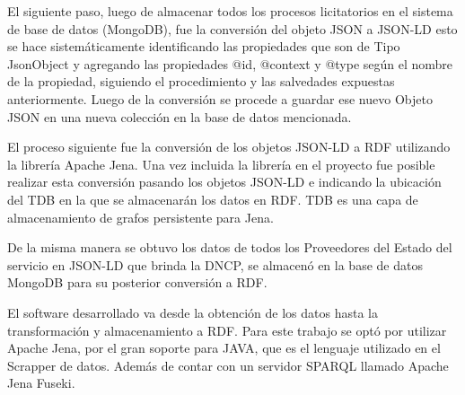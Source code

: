 El siguiente paso, luego de almacenar todos los procesos licitatorios en el sistema de base de datos  (MongoDB), fue la conversión del objeto JSON a JSON-LD esto se hace sistemáticamente identificando las propiedades que son de Tipo JsonObject y agregando las propiedades @id, @context y @type según el nombre de la propiedad, siguiendo el procedimiento y las salvedades expuestas anteriormente. Luego de la conversión se procede a guardar ese nuevo Objeto JSON en una nueva colección en la base de datos mencionada.

El proceso siguiente fue la conversión de los objetos JSON-LD a RDF utilizando la librería Apache Jena. Una vez incluida la librería en el proyecto fue posible realizar esta conversión pasando los objetos JSON-LD e indicando la ubicación del TDB en la que se almacenarán los datos en RDF. TDB es una capa de almacenamiento de grafos persistente para Jena.

De la misma manera se obtuvo los datos de todos los Proveedores del Estado del servicio en JSON-LD que brinda la DNCP, se almacenó en la base de datos MongoDB para su posterior conversión a RDF. 

El software desarrollado va desde la obtención de los datos hasta la transformación y almacenamiento a RDF. Para este trabajo se optó por utilizar Apache Jena, por el gran soporte para JAVA, que es el lenguaje utilizado en el Scrapper de datos. Además de contar con un servidor SPARQL llamado Apache Jena Fuseki.


